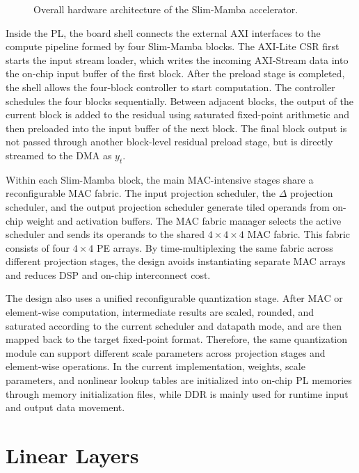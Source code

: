 \documentclass[11pt,twoside]{eitExjobb}
\begin{document}
\begin{figure}[H]
  \centering
  
  \caption{Overall hardware architecture of the Slim-Mamba accelerator.}
  \label{fig:tcas_hardware_architecture}
\end{figure}

Inside the PL, the board shell connects the external AXI interfaces to the compute
pipeline formed by four Slim-Mamba blocks. The AXI-Lite CSR first starts the input
stream loader, which writes the incoming AXI-Stream data into the on-chip input buffer
of the first block. After the preload stage is completed, the shell allows the four-block
controller to start computation. The controller schedules the four blocks sequentially.
Between adjacent blocks, the output of the current block is added to the residual using
saturated fixed-point arithmetic and then preloaded into the input buffer of the next
block. The final block output is not passed through another block-level residual
preload stage, but is directly streamed to the DMA as $y_t$.


Within each Slim-Mamba block, the main MAC-intensive stages share a reconfigurable MAC
fabric. The input projection scheduler, the $\Delta$ projection scheduler, and the
output projection scheduler generate tiled operands from on-chip weight and activation
buffers. The MAC fabric manager selects the active scheduler and sends its operands to
the shared $4\times4\times4$ MAC fabric. This fabric consists of four $4\times4$ PE
arrays. By time-multiplexing the same fabric across different projection stages, the
design avoids instantiating separate MAC arrays and reduces DSP and on-chip
interconnect cost.


The design also uses a unified reconfigurable quantization stage. After MAC or
element-wise computation, intermediate results are scaled, rounded, and saturated
according to the current scheduler and datapath mode, and are then mapped back to the
target fixed-point format. Therefore, the same quantization module can support
different scale parameters across projection stages and element-wise operations. In the
current implementation, weights, scale parameters, and nonlinear lookup tables are
initialized into on-chip PL memories through memory initialization files, while DDR is
mainly used for runtime input and output data movement.


\section{Linear Layers}
\label{subsec:linear_layer_mac_array}
\end{document}
